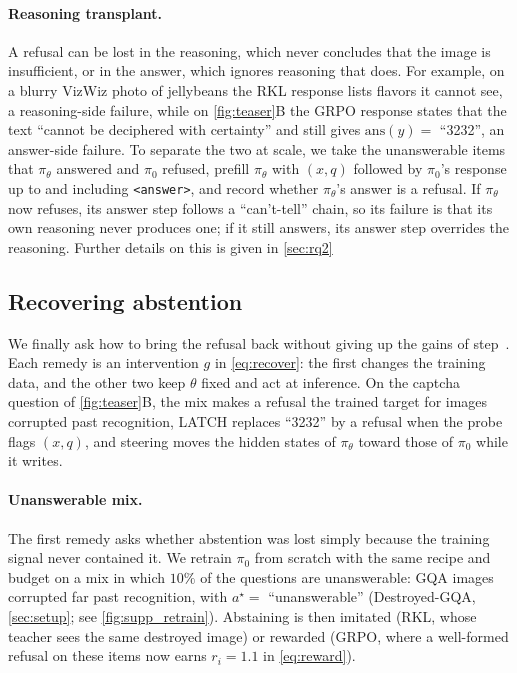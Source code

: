 \paragraph{Reasoning transplant.}
A refusal can be lost in the reasoning, which never concludes that the image is
insufficient, or in the answer, which ignores reasoning that does. For example, on a blurry VizWiz photo
of jellybeans the RKL response lists flavors it cannot see, a reasoning-side failure, while
on \cref{fig:teaser}B the GRPO response states that the text ``cannot be deciphered with
certainty'' and still gives $\mathrm{ans}(y) = $ ``3232'', an answer-side failure. To separate the two at scale, we
take the unanswerable items that $\pi_\theta$ answered and $\pi_0$ refused, prefill
$\pi_\theta$ with $(x, q)$ followed by $\pi_0$'s response up to and including
\texttt{<answer>}, and record whether $\pi_\theta$'s answer is a refusal. If $\pi_\theta$
now refuses, its answer step follows a ``can't-tell'' chain, so its failure is that its own
reasoning never produces one; if it still answers, its answer step overrides the reasoning. Further details on this is given in \cref{sec:rq2}

\subsection{Recovering abstention}
\label{sec:method-remedies}

We finally ask how to bring the refusal back without giving up the gains of
step~. Each remedy is an intervention $g$ in \cref{eq:recover}: the first changes
the training data, and the other two keep $\theta$ fixed and act at inference. On the
captcha question of \cref{fig:teaser}B, the mix makes a refusal the trained target for
images corrupted past recognition, LATCH replaces ``3232'' by a refusal when the
probe flags $(x,q)$, and steering moves the hidden states of $\pi_\theta$ toward those of
$\pi_0$ while it writes.

\paragraph{Unanswerable mix.}
The first remedy asks whether abstention was lost simply because the training signal never
contained it. We retrain $\pi_0$ from scratch with the same recipe and budget on a mix in
which $10\%$ of the questions are unanswerable: GQA images corrupted far past recognition,
with $a^\star = $ ``unanswerable'' (Destroyed-GQA, \cref{sec:setup}; see \cref{fig:supp_retrain}). Abstaining is then
imitated (RKL, whose teacher sees the same destroyed image) or rewarded (GRPO, where a
well-formed refusal on these items now earns $r_i = 1.1$ in \cref{eq:reward}).

